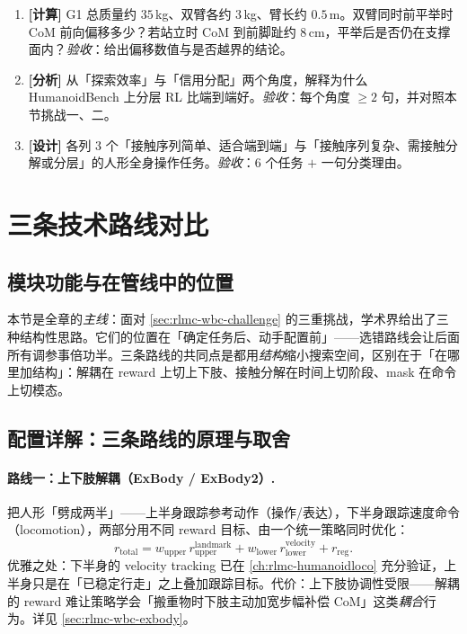 \begin{practice}[本节动手]
\begin{enumerate}
  \item \textbf{[计算]} G1 总质量约 $35$\,kg、双臂各约 $3$\,kg、臂长约 $0.5$\,m。双臂同时前平举时 CoM 前向偏移多少？若站立时 CoM 到前脚趾约 $8$\,cm，平举后是否仍在支撑面内？\emph{验收}：给出偏移数值与是否越界的结论。
  \item \textbf{[分析]} 从「探索效率」与「信用分配」两个角度，解释为什么 HumanoidBench 上分层 RL 比端到端好。\emph{验收}：每个角度 $\geq 2$ 句，并对照本节挑战一、二。
  \item \textbf{[设计]} 各列 $3$ 个「接触序列简单、适合端到端」与「接触序列复杂、需接触分解或分层」的人形全身操作任务。\emph{验收}：$6$ 个任务 $+$ 一句分类理由。
\end{enumerate}
\end{practice}

\section{三条技术路线对比}\label{sec:rlmc-wbc-routes}

\subsection{模块功能与在管线中的位置}
本节是全章的\emph{主线}：面对 \cref{sec:rlmc-wbc-challenge} 的三重挑战，学术界给出了三种结构性思路。它们的位置在「确定任务后、动手配置前」——选错路线会让后面所有调参事倍功半。三条路线的共同点是都用\emph{结构}缩小搜索空间，区别在于「在哪里加结构」：解耦在 reward 上切上下肢、接触分解在时间上切阶段、mask 在命令上切模态。

\subsection{配置详解：三条路线的原理与取舍}

\paragraph{路线一：上下肢解耦（ExBody / ExBody2）.}
把人形「劈成两半」——上半身跟踪参考动作（操作/表达），下半身跟踪速度命令（locomotion），两部分用不同 reward 目标、由一个统一策略同时优化：
\begin{equation}
r_{\mathrm{total}} = w_{\mathrm{upper}}\, r_{\mathrm{upper}}^{\mathrm{landmark}} + w_{\mathrm{lower}}\, r_{\mathrm{lower}}^{\mathrm{velocity}} + r_{\mathrm{reg}}.
\label{eq:rlmc-wbc-decouple}
\end{equation}
优雅之处：下半身的 velocity tracking 已在 \cref{ch:rlmc-humanoidloco} 充分验证，上半身只是在「已稳定行走」之上叠加跟踪目标。代价：上下肢协调性受限——解耦的 reward 难让策略学会「搬重物时下肢主动加宽步幅补偿 CoM」这类\emph{耦合}行为。详见 \cref{sec:rlmc-wbc-exbody}。

